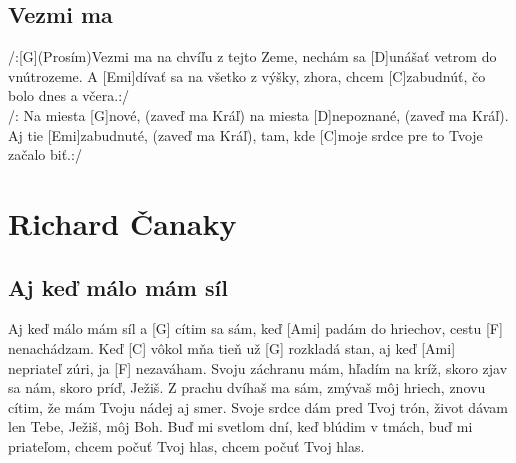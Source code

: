 \documentclass[10pt]{article}
\begin{document}
\begin{Large}
\begin{minipage}{\textwidth}
\subsection{Vezmi ma}
\begin{multicols*}{2}
\begin{guitar}
	/:[G](Prosím)Vezmi ma na chvíľu z tejto Zeme,
	nechám sa [D]unášať vetrom do vnútrozeme.
	A [Emi]dívať sa na všetko z výšky, zhora,
	chcem [C]zabudnúť, čo bolo dnes a včera.:/
	\\
	/: Na miesta [G]nové, (zaveď ma Kráľ)
	na miesta [D]nepoznané, (zaveď ma Kráľ).
	Aj tie [Emi]zabudnuté, (zaveď ma Kráľ),
	tam, kde [C]moje srdce pre to Tvoje začalo biť.:/
\end{guitar}
\end{multicols*}
\end{minipage}

\newpage

\begin{minipage}{\textwidth}
\section{Richard Čanaky}
\subsection{Aj keď málo mám síl}
\begin{multicols*}{3}
\begin{guitar}
	[C] Aj keď málo mám síl 
	a [G] cítim sa sám,
	keď [Ami] padám do hriechov, 
	cestu [F] nenachádzam.
	Keď [C] vôkol mňa tieň 
	už [G] rozkladá stan,
	aj keď [Ami] nepriateľ zúri, 
	ja [F] nezaváham.
	\columnbreak
	Svoju záchranu mám, 
	hľadím na kríž,
	skoro zjav sa nám, 
	skoro príď, Ježiš.
	Z prachu dvíhaš ma sám, 
	zmývaš môj hriech,
	znovu cítim, že mám 
	Tvoju nádej aj smer.
	\columnbreak
	Svoje srdce dám pred Tvoj 
	trón,
	život dávam len Tebe, 
	Ježiš, môj Boh.
	Buď mi svetlom dní, 
	keď blúdim v tmách,
	buď mi priateľom, 
	chcem počuť Tvoj hlas,
	chcem počuť Tvoj hlas.	
\end{guitar}
\end{multicols*}
\end{minipage}

\begin{minipage}{\textwidth}

\end{minipage}
\end{Large}
\end{document}
